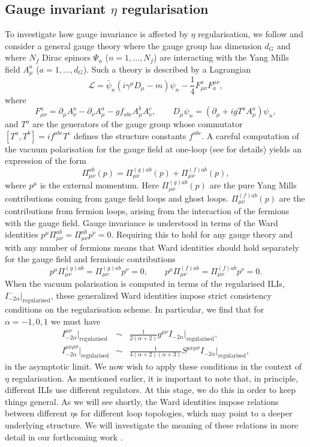 \documentclass[11pt, letter]{article}
\def\be{\begin{equation}}
\def\ee{\end{equation}}
\begin{document}
\subsection{Gauge invariant $\eta$ regularisation}\label{VacuumPolarisation}
To investigate how gauge invariance is affected by $\eta$ regularisation, we follow \cite{Wu03, Wu04, Wu14} and consider a general gauge theory where the gauge group has dimension $d_G$ and where $N_f$ Dirac spinors $\Psi_n$ ($n=1, \ldots, N_f$) are interacting with the Yang Mills field $A^a_\mu$ ($a=1, \ldots, d_G$). Such a theory is described by a Lagrangian
\be
\mathcal{L}=\bar \psi_n (i\gamma^\mu D_\mu-m)\psi_n -\frac14 F_{\mu\nu}^a F^{\mu\nu}_a,
\ee
where
\be
F^a_{\mu\nu}=\partial_{\mu} A_\nu^a-\partial_{\nu} A_\mu^a - gf_{abc} A^b_\mu A^c_\nu, \qquad D_\mu \psi_n=(\partial_\mu +ig T^a A^a_\mu )\psi_n,
\ee
and  $T^a$ are the generators of the gauge group whose commutator $[T^a, T^b]=i f^{abc}T^c$ defines the structure constants $f^{abc}$. A careful computation of the vacuum polarisation  for the gauge field at one-loop (see \cite{Wu03, Wu04, Wu14} for details) yields an expression of the form 
\be
\Pi^{ab}_{\mu\nu}(p)=\Pi^{(g) ab}_{\mu\nu}(p)+\Pi^{(f) ab}_{\mu\nu}(p),
\ee
where $p^\mu$ is the external momentum. Here   $\Pi^{(g) ab}_{\mu\nu}(p)$ are the pure Yang Mills contributions coming from  gauge field loops and ghost loops.  $\Pi^{(f) ab}_{\mu\nu}(p)$ are the contributions from fermion loops, arising from the interaction of the fermions with the gauge field.  Gauge invariance is understood in terms of the Ward identities $p^\mu\Pi^{ab}_{\mu\nu}=\Pi^{ab}_{\mu\nu}p^\nu=0$.  Requiring this to hold for any gauge theory and with any number of fermions means that Ward identities should hold separately for the gauge field and fermionic contributions
\be \label{condition}
 p^\mu\Pi^{{(g)} ab}_{\mu\nu}=\Pi^{(g)ab}_{\mu\nu}p^\nu=0, \qquad  p^\mu\Pi^{{(f)} ab}_{\mu\nu}=\Pi^{(f)ab}_{\mu\nu}p^\nu=0.
\ee
When the vacuum polarisation is computed in terms of the regularised ILIs, $I^{\cdots}_{-2\alpha}|_\text{regularised}$, these generalized Ward identities  impose strict consistency conditions  on the regularisation scheme. In particular,  we find that for $\alpha=-1, 0, 1$ we must have  \cite{Wu03,Xing:2022jtt}
\begin{eqnarray}
I^{\mu\nu}_{-2\alpha}|_\text{regularised} &\sim&\frac{1}{2(\alpha+2)} g^{\mu\nu} I_{-2\alpha}|_\text{regularised}  \label{cond1}, \\
I^{\mu\nu\rho \sigma}_{-2\alpha}|_\text{regularised} &\sim &\frac{1}{4(\alpha+2)(\alpha+3)} S^{\mu\nu\rho\sigma} I_{-2\alpha}|_\text{regularised}, \label{cond2}
\end{eqnarray}
in the asymptotic limit. We now wish to apply these conditions in the context of $\eta$ regularisation. As mentioned earlier, it is important to note that, in principle, different ILIs use different regulators. At this stage, we do this in order to keep things general.  As we will see shortly,  the Ward identities impose relations between different $\eta$s for different loop topologies, which may point to a deeper underlying structure. We will investigate the meaning of these relations in more detail in our forthcoming work \cite{PadillaSmith23}.
\end{document}
